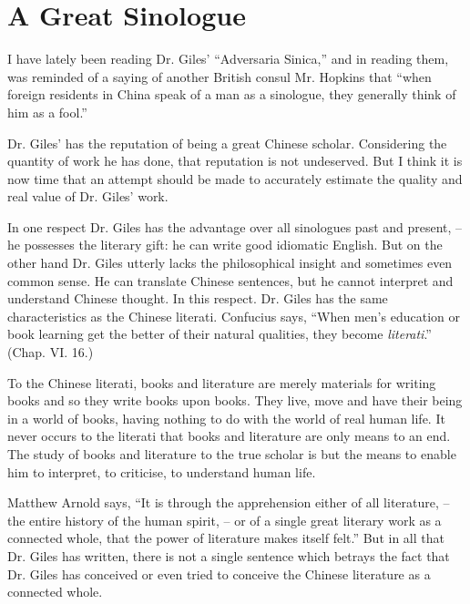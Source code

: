 
\chapter[A Great Sinologue]
{A Great Sinologue}


I have lately been reading Dr. Giles' ``Adversaria Sinica,'' and in reading them,
was reminded of a saying of another British consul Mr. Hopkins that
``when foreign residents in China speak of a man as a sinologue,
they generally think of him as a fool.''

Dr. Giles' has the reputation of being a great Chinese scholar.
Considering the quantity of work he has done, that reputation is not undeserved.
But I think it is now time that an attempt should be made to accurately estimate the quality and real value of Dr. Giles' work.

In one respect Dr. Giles has the advantage over all sinologues past and present,
-- he possesses the literary gift: he can write good idiomatic English.
But on the other hand Dr. Giles utterly lacks the philosophical insight
and sometimes even common sense.
He can translate Chinese sentences,
but he cannot interpret and understand Chinese thought.
In this respect. Dr. Giles has the same characteristics as the Chinese literati. Confucius says,
``When men's education or book learning get the better of their natural qualities,
they become \emph{literati}.'' (Chap. VI. 16.)

To the Chinese literati, books and literature are merely materials for writing books and so they write books upon books.
They live, move and have their being in a world of books, having nothing to do with the world of real human life.
It never occurs to the literati that books and literature are only means to an end.
The study of books and literature to the true scholar is but the means to enable him to interpret,
to criticise, to understand human life.

Matthew Arnold says, ``It is through the apprehension either of all literature,
-- the entire history of the human spirit,
-- or of a single great literary work as a connected whole, that the power of literature makes itself felt.''
But in all that Dr. Giles has written, there is not a single sentence which betrays the fact that Dr. Giles has conceived or even tried to conceive the Chinese literature as a connected whole.

